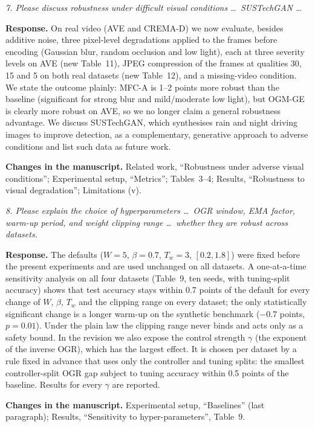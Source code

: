 \documentclass[11pt,a4paper]{article}
\newcommand{\rc}[1]{\par\noindent\colorbox{gray!12}{\parbox{\dimexpr\linewidth-2\fboxsep}{\small\textit{#1}}}\par}
\newcommand{\resp}{\par\noindent\textbf{Response.} }
\newcommand{\chg}{\par\noindent\textbf{Changes in the manuscript.} }
\begin{document}
\rc{7. Please discuss robustness under difficult visual conditions \ldots\ SUSTechGAN \ldots}
\resp On real video (AVE and CREMA-D) we now evaluate, besides additive noise, three pixel-level degradations applied to the frames before encoding (Gaussian blur, random occlusion and low light), each at three severity levels on AVE (new Table~11), JPEG compression of the frames at qualities 30, 15 and 5 on both real datasets (new Table~12), and a missing-video condition. We state the outcome plainly: MFC-A is 1--2 points more robust than the baseline (significant for strong blur and mild/moderate low light), but OGM-GE is clearly more robust on AVE, so we no longer claim a general robustness advantage. We discuss SUSTechGAN, which synthesises rain and night driving images to improve detection, as a complementary, generative approach to adverse conditions and list such data as future work.
\chg Related work, ``Robustness under adverse visual conditions''; Experimental setup, ``Metrics''; Tables~3--4; Results, ``Robustness to visual degradation''; Limitations (v).

\rc{8. Please explain the choice of hyperparameters \ldots\ OGR window, EMA factor, warm-up period, and weight clipping range \ldots\ whether they are robust across datasets.}
\resp The defaults ($W{=}5$, $\beta{=}0.7$, $T_w{=}3$, $[0.2,1.8]$) were fixed before the present experiments and are used unchanged on all datasets. A one-at-a-time sensitivity analysis on all four datasets (Table~9, ten seeds, with tuning-split accuracy) shows that test accuracy stays within 0.7 points of the default for every change of $W$, $\beta$, $T_w$ and the clipping range on every dataset; the only statistically significant change is a longer warm-up on the synthetic benchmark ($-0.7$ points, $p{=}0.01$). Under the plain law the clipping range never binds and acts only as a safety bound. In the revision we also expose the control strength $\gamma$ (the exponent of the inverse OGR), which has the largest effect. It is chosen per dataset by a rule fixed in advance that uses only the controller and tuning splits: the smallest controller-split OGR gap subject to tuning accuracy within 0.5 points of the baseline. Results for every $\gamma$ are reported.
\chg Experimental setup, ``Baselines'' (last paragraph); Results, ``Sensitivity to hyper-parameters'', Table~9.
\end{document}
